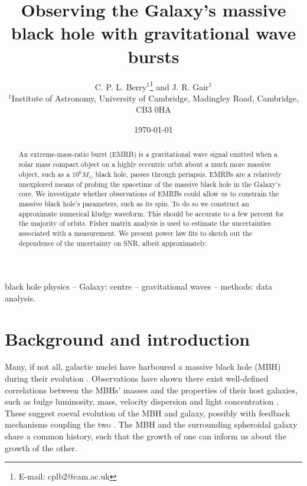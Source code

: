 \documentclass[useAMS,usedcolumn,usegraphicx,usenatbib]{mn2e}
\title[Observing the Galaxy's MBH with GW bursts]{Observing the Galaxy's massive black hole with gravitational wave bursts}
\author[C. P. L. Berry and J. R. Gair]{C. P. L. Berry$^{1}$\thanks{E-mail:
cplb2@cam.ac.uk}  and J. R. Gair$^{1}$\\
$^{1}$Institute of Astronomy, University of Cambridge, Madingley Road, Cambridge, CB3 0HA}
\begin{document}
\date{\today}

\pagerange{\pageref{firstpage}--\pageref{lastpage}} 

\maketitle

\label{firstpage}

\begin{abstract}
An extreme-mass-ratio burst (EMRB) is a gravitational wave signal emitted when a solar mass compact object on a highly eccentric orbit about a much more massive object, such as a $10^6 M_\odot$ black hole, passes through periapsis. EMRBs are a relatively unexplored means of probing the spacetime of the massive black hole in the Galaxy's core. We investigate whether observations of EMRBs could allow us to constrain the massive black hole's parameters, such as its spin. To do so we construct an approximate numerical kludge waveform. This should be accurate to a few percent for the majority of orbits. Fisher matrix analysis is used to estimate the uncertainties associated with a measurement. We present power law fits to sketch out the dependence of the uncertainty on SNR, albeit approximately.
\end{abstract}

\begin{keywords}
black hole physics -- Galaxy: centre -- gravitational waves -- methods: data analysis.
\end{keywords}

\section{Background and introduction}\label{sec:Intro}

Many, if not all, galactic nuclei have harboured a massive black hole (MBH) during their evolution \citep{Lynden-Bell1971, Soltan1982, Rees1984}. Observations have shown there exist well-defined correlations between the MBHs' masses and the properties of their host galaxies, such as bulge luminosity, mass, velocity dispersion and light concentration \citep{Kormendy1995, Magorrian1998, Ferrarese2000, Gebhardt2000, Graham2001, Tremaine2002, Marconi2003, Haring2004, Graham2007, Graham2011}. These suggest coeval evolution of the MBH and galaxy, possibly with feedback mechanisms coupling the two \citep{Haiman2004, Volonteri2009}. The MBH and the surrounding spheroidal galaxy share a common history, such that the growth of one can inform us about the growth of the other.
\end{document}
